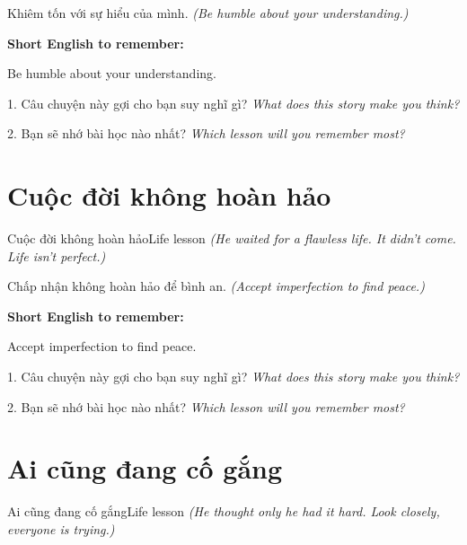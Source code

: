 \begin{baihoc}
Khiêm tốn với sự hiểu của mình.
\textit{(Be humble about your understanding.)}
\end{baihoc}

\begin{ghinhoanh}
\textbf{Short English to remember:}

Be humble about your understanding.

\end{ghinhoanh}

\begin{tuhocnhanh}
1. Câu chuyện này gợi cho bạn suy nghĩ gì? \textit{What does this story make you think?}

2. Bạn sẽ nhớ bài học nào nhất? \textit{Which lesson will you remember most?}
\end{tuhocnhanh}
\ngancach


\section{Cuộc đời không hoàn hảo}
\begin{truyen}{Cuộc đời không hoàn hảo}{Life lesson}
\textit{(He waited for a flawless life. It didn't come. Life isn't perfect.)}
\end{truyen}

\begin{baihoc}
Chấp nhận không hoàn hảo để bình an.
\textit{(Accept imperfection to find peace.)}
\end{baihoc}

\begin{ghinhoanh}
\textbf{Short English to remember:}

Accept imperfection to find peace.

\end{ghinhoanh}

\begin{tuhocnhanh}
1. Câu chuyện này gợi cho bạn suy nghĩ gì? \textit{What does this story make you think?}

2. Bạn sẽ nhớ bài học nào nhất? \textit{Which lesson will you remember most?}
\end{tuhocnhanh}
\ngancach


\section{Ai cũng đang cố gắng}
\begin{truyen}{Ai cũng đang cố gắng}{Life lesson}
\textit{(He thought only he had it hard. Look closely, everyone is trying.)}
\end{truyen}

